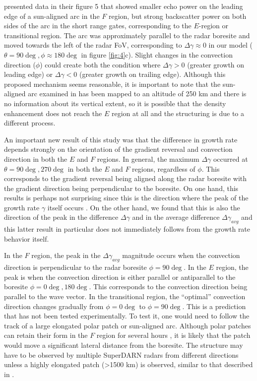 \citet{Koustov2008} presented data in their figure 5 that showed smaller echo power on the leading edge of a sun-aligned arc in the \(F\) region, but strong backscatter power on both sides of the arc in the short range gates, corresponding to the \(E\)-region or transitional region.  The arc was approximately parallel to the radar boresite and moved towards the left of the radar FoV, corresponding to \(\Delta\gamma\approx 0\) in our model (\(\theta=90\deg,\phi\approx 180\deg\) in figure \ref{fig:4}c).  Slight changes in the convection direction (\(\phi\)) could create both the condition where \(\Delta\gamma>0\) (greater growth on leading edge) or \(\Delta\gamma<0\) (greater growth on trailing edge).  Although this proposed mechanism seems reasonable, it is important to note that the sun-aligned arc examined in \citet{Koustov2008} has been mapped to an altitude of 250 km and there is no information about its vertical extent, so it is possible that the density enhancement does not reach the \(E\) region at all and the structuring is due to a different process.

An important new result of this study was that the difference in growth rate depends strongly on the orientation of the gradient reversal and convection direction in both the \(E\) and \(F\) regions. In general, the maximum \(\Delta\gamma\) occurred at \(\theta=90\deg,270\deg\) in both the \(E\) and \(F\) regions, regardless of \(\phi\).  This corresponds to the gradient reversal being aligned along the radar boresite with the gradient direction being perpendicular to the boresite. On one hand, this results is perhaps not surprising since this is the direction where the peak of the growth rate \(\gamma\) itself occurs \citep{Makarevich2014c}. On the other hand, we found that this is also the direction of the peak in the difference \(\Delta\gamma\) and in the average difference \(\Delta\gamma_{avg}\) and this latter result in particular does not immediately follows from the growth rate behavior itself.

In the \(F\) region, the peak in the \(\Delta\gamma_{avg}\) magnitude occurs when the convection direction is perpendicular to the radar boresite \(\phi=90\deg\). In the \(E\) region, the peak is when the convection direction is either parallel or antiparallel to the boresite \(\phi=0\deg, 180\deg\). This corresponds to the convection direction being parallel to the wave vector. In the transitional region, the ``optimal'' convection direction changes gradually from \(\phi=0\deg\) to \(\phi=90\deg\). This is a prediction that has not been tested experimentally. To test it, one would need to follow the track of a large elongated polar patch or sun-aligned arc.  Although polar patches can retain their form in the \(F\) region for several hours \citep{Hosokawa2014}, it is likely that the patch would move a significant lateral distance from the boresite.  The structure may have to be observed by multiple SuperDARN radars from different directions unless a highly elongated patch (>1500 km) is observed, similar to that described in \citet{Hosokawa2014}. 

